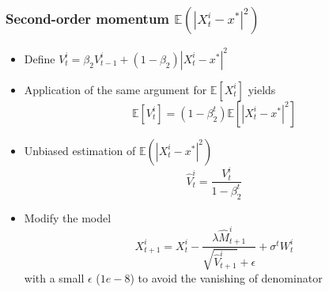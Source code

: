 \documentclass{beamer}
\begin{document}
\begin{frame}
	\frametitle{Second-order momentum $\mathbb{E}(|X^i_t-x^*|^2)$}
	
	\begin{itemize}
		\item Define $V^i_t  = \beta_2 V^i_{t-1} + (1-\beta_2) |X^i_t - x^*|^2$
		\item[] Application of the same argument for $\mathbb{E}[X^i_t]$ yields
		\begin{equation*}
		\mathbb{E}[V^i_t] = (1-\beta_2^t) \mathbb{E}[|X^i_t-x^*|^2]
		\end{equation*}
		\item[] Unbiased estimation of $\mathbb{E}(|X^i_t-x^*|^2)$
		\[\hat{V}^i_t = \frac{V^i_t}{1-\beta_2^t}\]
		\item Modify the model
		\begin{equation*}
			X^i_{t+1} = X_t^i - \frac{\lambda \hat{M}^i_{t+1}}{\sqrt{\hat{V}^i_{t+1}} + \epsilon} + \sigma^ t  W_t^i
		\end{equation*}
		with a small $\epsilon$ ($1e-8$) to avoid the vanishing of denominator
	\end{itemize}

\end{frame}
\end{document}

